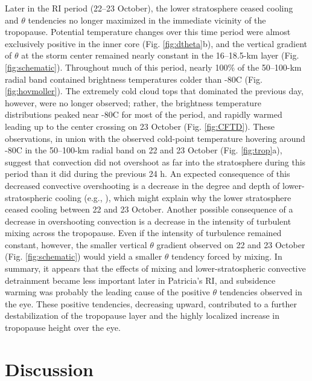 Later in the RI period (22--23 October), the lower stratosphere ceased cooling and $\theta$ tendencies no longer maximized in the immediate vicinity of the tropopause.
Potential temperature changes over this time period were almost exclusively positive in the inner core (Fig. \ref{fig:dtheta}b), and the vertical gradient of $\theta$ at the storm center remained nearly constant in the 16--18.5-km layer (Fig. \ref{fig:schematic}).
Throughout much of this period, nearly 100\% of the 50--100-km radial band contained brightness temperatures colder than -80\textdegree{}C (Fig. \ref{fig:hovmoller}).
The extremely cold cloud tops that dominated the previous day, however, were no longer observed; rather, the brightness temperature distributions peaked near -80\textdegree{}C for most of the period, and rapidly warmed leading up to the center crossing on 23 October (Fig. \ref{fig:CFTD}).
These observations, in union with the observed cold-point temperature hovering around -80\textdegree{}C in the 50--100-km radial band on 22 and 23 October (Fig. \ref{fig:trop}a), suggest that convection did not overshoot as far into the stratosphere during this period than it did during the previous 24 h.
An expected consequence of this decreased convective overshooting is a decrease in the degree and depth of lower-stratospheric cooling (e.g., \citeauthor{KuangBretherton2004} \citeyear{KuangBretherton2004}), which might explain why the lower stratosphere ceased cooling between 22 and 23 October.
Another possible consequence of a decrease in overshooting convection is a decrease in the intensity of turbulent mixing across the tropopause.
Even if the intensity of turbulence remained constant, however, the smaller vertical $\theta$ gradient observed on 22 and 23 October (Fig. \ref{fig:schematic}) would yield a smaller $\theta$ tendency forced by mixing.
In summary, it appears that the effects of mixing and lower-stratospheric convective detrainment became less important later in Patricia’s RI, and subsidence warming was probably the leading cause of the positive $\theta$ tendencies observed in the eye.
These positive tendencies, decreasing upward, contributed to a further destabilization of the tropopause layer and the highly localized increase in tropopause height over
the eye.

\section{Discussion}
\label{sec:discussion}

